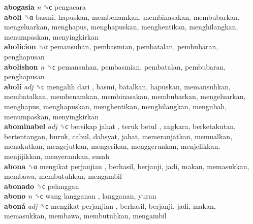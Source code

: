 \textbf{abogasia} \emph{n}  ␝ϲ  pengacara  \\
\textbf{aboli} ␝α  basmi, hapuskan, membenamkan, membinasakan, membubarkan, mengeluarkan, menghapus, menghapuskan, menghentikan, menghilangkan, menumpaskan, menyingkirkan  \\
\textbf{abolicion} ␝α  pemansuhan, pembasmian, pembatalan, pembubaran, penghapusan  \\
\textbf{abolishon} \emph{n}  ␝ϲ  pemansuhan, pembasmian, pembatalan, pembubaran, penghapusan  \\
\textbf{abolí} \emph{adj}  ␝ϲ   mengalih dari , basmi, batalkan, hapuskan, memansuhkan, membatalkan, membenamkan, membinasakan, membubarkan, mengeluarkan, menghapus, menghapuskan, menghentikan, menghilangkan, mengubah, menumpaskan, menyingkirkan  \\
\textbf{abominabel} \emph{adj}  ␝ϲ   bersikap jahat ,  teruk betul , angkara, berketakutan, bertentangan, buruk, cabul, dahsyat, jahat, memeranjatkan, memualkan, menakutkan, mengejutkan, mengerikan, menggerunkan, menjelikkan, menjijikkan, menyeramkan, susah  \\
\textbf{abona} ␝α   mengikat perjanjian , berhasil, berjanji, jadi, makan, memasukkan, membawa, membutuhkan, mengambil  \\
\textbf{abonado} ␝ϲ  pelanggan  \\
\textbf{abono} \emph{n}  ␝ϲ   wang langganan , langganan, yuran  \\
\textbf{aboná} \emph{adj}  ␝ϲ   mengikat perjanjian , berhasil, berjanji, jadi, makan, memasukkan, membawa, membutuhkan, mengambil  \\
